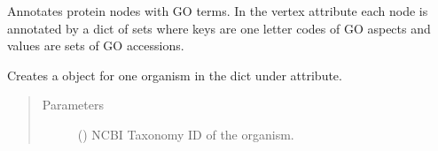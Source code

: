 \documentclass[letterpaper,10pt,english]{sphinxmanual}
\begin{document}
\begin{fulllineitems}

\begin{fulllineitems}
\label{\detokenize{main:pypath.main.PyPath.get_taxon}}
\end{fulllineitems}


\begin{fulllineitems}
\label{\detokenize{main:pypath.main.PyPath.go_annotate}}
Annotates protein nodes with GO terms. In the  vertex
attribute each node is annotated by a dict of sets where keys are
one letter codes of GO aspects and values are sets of GO accessions.

\end{fulllineitems}


\begin{fulllineitems}
\label{\detokenize{main:pypath.main.PyPath.go_dict}}
Creates a  object for one organism in the
dict under  attribute.
\begin{quote}\begin{description}
\item[{Parameters}] \leavevmode
{} () \textendash{} NCBI Taxonomy ID of the organism.

\end{description}\end{quote}

\end{fulllineitems}


\begin{fulllineitems}
\label{\detokenize{main:pypath.main.PyPath.go_enrichment}}
\end{fulllineitems}


\end{fulllineitems}
\end{document}
